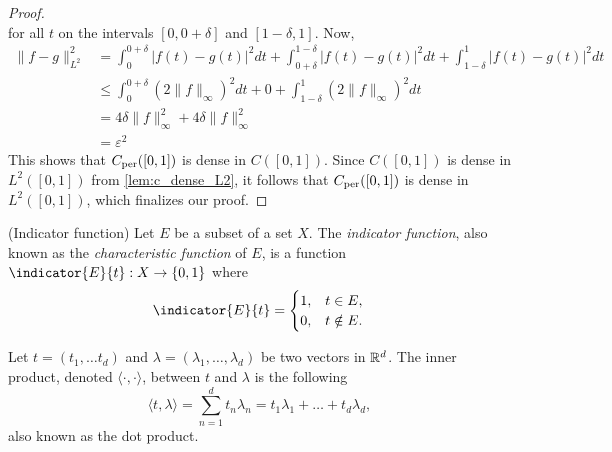 \documentclass[../thesis.tex]{subfiles}
\begin{document}
\begin{proof}
\begin{equation*}
    \end{equation*}
    for all $t$ on the intervals $[0, 0+\delta]$ and $[1-\delta,1]$. Now,
    \begin{align*}
        \| f-g \|_{L^2}^2 &=  \int_0^{0+\delta} \left|f(t)-g(t) \right|^2dt + \int_{0+\delta}^{1-\delta} \left|f(t)-g(t) \right|^2dt +\int_{1-\delta}^{1} \left|f(t)-g(t) \right|^2dt\\ 
        &\leq \int_0^{0+\delta} (2 \| f\|_\infty)^2dt + 0 +\int_{1-\delta}^{1} (2 \| f\|_\infty)^2dt\\
        &=  4 \delta \| f\|_\infty^2 + 4 \delta \| f\|_\infty^2\\ 
        &= \varepsilon^2
    \end{align*}
    This shows that $C_{\text{per}}([0,1])$ is dense in $C([0,1])$. Since $C([0,1])$ is dense in $L^2([0,1])$ from \cref{lem:c_dense_L2}, it follows that $C_{\text{per}}([0,1])$ is dense in $L^2([0,1])$, which finalizes our proof.
\end{proof}

\begin{definition}(Indicator function)\label{def:indicator}
    Let $E$ be a subset of a set $X$. The \emph{indicator function}, also known as the \emph{characteristic function} of $E$, is a function $\indicator{E}{t}: X \rightarrow \braq{0,1}$ where
    \begin{equation*}
        \indicator{E}{t}  = 
        \begin{cases} 
            1, &  t\in E,\\
            0, &  t \notin E.
        \end{cases}
        \qedhere
    \end{equation*}
\end{definition}


\begin{definition}\label{def:dot_prod}
    Let $t=(t_1,\dots t_d)$ and $\lambda=(\lambda_1, \dots, \lambda_d)$ be two vectors in $\mathbb{R}^d$. The inner product, denoted $\langle \cdot, \cdot \rangle$, between $t$ and $\lambda$ is the following 
    \begin{equation*}
        \langle t, \lambda \rangle = \sum_{n=1}^d t_n \lambda_n = t_1\lambda_1 + \dots + t_d\lambda_d,
    \end{equation*}
    also known as the dot product. 
\end{definition}
\end{document}
